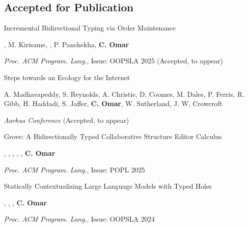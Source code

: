 \documentclass[10pt,letterpaper]{article}
\renewenvironment{itemize}{
  \begin{list}{}{
    \setlength{\leftmargin}{1.25em}
    \setlength{\itemsep}{0.25em}
    \setlength{\parskip}{0pt}
    \setlength{\parsep}{0.2em}
  }
}{
  \end{list}
}
\begin{document}
\subsection*{Accepted for Publication}
\begin{enumerate}[leftmargin=*, labelindent=6.5em, font=\bfseries]
  \item[OOPSLA 2025]{Incremental Bidirectional Typing via Order Maintenance}
  \begin{itemize}
    \item {}, M. Kirisame, , P. Panchekha, \textbf{C. Omar}
    \item \textit{Proc. ACM Program. Lang.}, Issue: OOPSLA 2025 (Accepted, to appear)
  \end{itemize}
  \item[Aarhus 2025]{Steps towards an Ecology for the Internet}
  \begin{itemize}
    \item A. Madhavapeddy, S. Reynolds, A. Christie, D. Coomes, M. Dales, P. Ferris, R. Gibb, H. Haddadi, S. Jaffer, 
    \textbf{C. Omar}, W. Sutherland, J. W, Crowcroft
    \item \textit{Aarhus Conference} (Accepted, to appear)
  \end{itemize}
  \item[POPL 2025]{Grove: A Bidirectionally Typed Collaborative Structure Editor Calculus}
  \begin{itemize}
    \item {}, , , , , \textbf{C. Omar}
    \item \textit{Proc. ACM Program. Lang.}, Issue: POPL 2025
  \end{itemize}
  \item[OOPSLA 2024]{Statically Contextualizing Large Language Models with Typed Holes}
  \begin{itemize}
    \item {}, , , \textbf{C. Omar}
    \item \textit{Proc. ACM Program. Lang.}, Issue: OOPSLA 2024

\end{itemize}
\end{enumerate}
\end{document}
